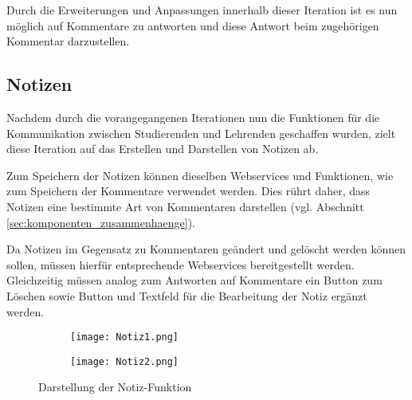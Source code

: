 Durch die Erweiterungen und Anpassungen innerhalb dieser Iteration ist es nun möglich auf Kommentare zu antworten und diese Antwort beim zugehörigen Kommentar darzustellen.

\subsection{Notizen}
\label{sub:notizen}
Nachdem durch die vorangegangenen Iterationen nun die Funktionen für die Kommunikation zwischen Studierenden und Lehrenden geschaffen wurden, zielt diese Iteration auf das Erstellen und Darstellen von Notizen ab.

Zum Speichern der Notizen können dieselben Webservices und Funktionen, wie zum Speichern der Kommentare verwendet werden. Dies rührt daher, dass Notizen eine bestimmte Art von Kommentaren darstellen (vgl. Abschnitt \ref{sec:komponenten_zusammenhaenge}). 

Da Notizen im Gegensatz zu Kommentaren geändert und gelöscht werden können sollen, müssen hierfür entsprechende Webservices bereitgestellt werden. Gleichzeitig müssen analog zum Antworten auf Kommentare ein Button zum Löschen sowie Button und Textfeld für die Bearbeitung der Notiz ergänzt werden.

\begin{figure}[h!]
\begin{subfigure}[c]{0.5\textwidth}
\texttt{[image: Notiz1.png]}
\label{fig:Notiz1}
\end{subfigure}%
\begin{subfigure}[c]{0.5\textwidth}
\texttt{[image: Notiz2.png]}
\label{fig:Notiz2}
\end{subfigure}
\caption{Darstellung der Notiz-Funktion}
\label{fig:Notiz}
\end{figure}


